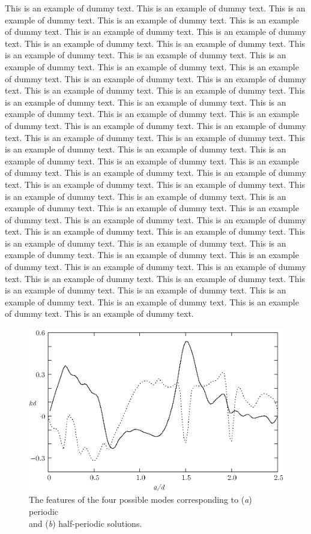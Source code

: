 \documentclass[lineno]{jfm}
\begin{document}
 This is an example of dummy text. This is an example of dummy text. This is an example of dummy text. This is an example of dummy text. This is an example of dummy text. This is an example of dummy text. This is an example of dummy text. This is an example of dummy text. This is an example of dummy text. This is an example of dummy text. This is an example of dummy text. This is an example of dummy text. This is an example of dummy text. This is an example of dummy text. This is an example of dummy text. This is an example of dummy text. This is an example of dummy text. This is an example of dummy text. This is an example of dummy text. This is an example of dummy text. This is an example of dummy text. This is an example of dummy text. This is an example of dummy text. This is an example of dummy text. This is an example of dummy text. This is an example of dummy text. This is an example of dummy text. This is an example of dummy text. This is an example of dummy text. This is an example of dummy text. This is an example of dummy text. This is an example of dummy text. This is an example of dummy text. This is an example of dummy text. This is an example of dummy text. This is an example of dummy text. This is an example of dummy text. This is an example of dummy text. This is an example of dummy text. This is an example of dummy text. This is an example of dummy text. This is an example of dummy text. This is an example of dummy text. This is an example of dummy text. This is an example of dummy text. This is an example of dummy text. This is an example of dummy text. This is an example of dummy text. This is an example of dummy text. This is an example of dummy text. This is an example of dummy text. This is an example of dummy text. This is an example of dummy text. This is an example of dummy text. This is an example of dummy text. This is an example of dummy text. This is an example of dummy text. This is an example of dummy text. This is an example of dummy text. This is an example of dummy text. 

\begin{figure}
  \centerline{\includegraphics{Fig2}}
  \caption{The features of the four possible modes corresponding to
  (\textit{a}) periodic\protect\\ and (\textit{b}) half-periodic solutions.}
\label{fig:kd}
\end{figure}
\end{document}
